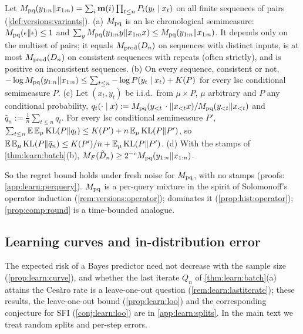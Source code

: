 \begin{proposition}\label{prop:learn:perquery}
Let $M_{\mathrm{pq}}(y_{1:n}\Vert x_{1:n})=\sum_i\mathbf{m}(i)\prod_{t\le n}P_i(y_t\mid x_t)$ on all finite sequences of pairs (\cref{def:versions:variants}).
(a) $M_{\mathrm{pq}}$ is an lsc chronological semimeasure: $M_{\mathrm{pq}}(\epsilon\Vert\epsilon)\le1$ and $\sum_yM_{\mathrm{pq}}(y_{1:n}y\Vert x_{1:n}x)\le M_{\mathrm{pq}}(y_{1:n}\Vert x_{1:n})$. It depends only on the multiset of pairs; it equals $M_{\mathrm{prod}}(D_n)$ on sequences with distinct inputs, is at most $M_{\mathrm{prod}}(D_n)$ on consistent sequences with repeats (often strictly), and is positive on inconsistent sequences.
(b) On every sequence, consistent or not, $-\log M_{\mathrm{pq}}(y_{1:n}\Vert x_{1:n})\le\sum_{t\le n}-\log P(y_t\mid x_t)+K(P)$ for every lsc conditional semimeasure $P$.
(c) Let $(x_t,y_t)$ be i.i.d.\ from $\mu\times P$, $\mu$ arbitrary and $P$ any conditional probability, $q_t(\cdot\mid x):=M_{\mathrm{pq}}(y_{<t}\,\cdot\Vert x_{<t}x)/M_{\mathrm{pq}}(y_{<t}\Vert x_{<t})$ and $\bar q_n:=\frac1n\sum_{t\le n}q_t$. For every lsc conditional semimeasure $P'$, $\sum_{t\le n}\mathbb{E}\,\mathbb{E}_\mu\operatorname{KL}(P\|q_t)\le K(P')+n\,\mathbb{E}_\mu\operatorname{KL}(P\|P')$, so $\mathbb{E}\,\mathbb{E}_\mu\operatorname{KL}(P\|\bar q_n)\le K(P')/n+\mathbb{E}_\mu\operatorname{KL}(P\|P')$.
(d) With the stamps of \cref{thm:learn:batch}(b), $M_{F}(\tilde D_n)\ge2^{-c}M_{\mathrm{pq}}(y_{1:n}\Vert x_{1:n})$.
\end{proposition}

So the regret bound holds under fresh noise for $M_{\mathrm{pq}}$, with no stamps (proofs: \cref{app:learn:perquery}). $M_{\mathrm{pq}}$ is a per-query mixture in the spirit of Solomonoff's operator induction (\cref{rem:versions:operator}); \SFIhist{} dominates it (\cref{prop:hist:operator}); \cref{prop:comp:round} is a time-bounded analogue.

\subsection{Learning curves and in-distribution error}\label{sec:learn:curves}

The expected risk of a Bayes predictor need not decrease with the sample size (\cref{prop:learn:curve}), and whether the last iterate $Q_n$ of \cref{thm:learn:batch}(a) attains the Ces\`aro rate is a leave-one-out question (\cref{rem:learn:lastiterate}); these results, the leave-one-out bound (\cref{prop:learn:loo}) and the corresponding conjecture for SFI (\cref{conj:learn:loo}) are in \cref{app:learn:splits}. In the main text we treat random splits and per-step errors.

